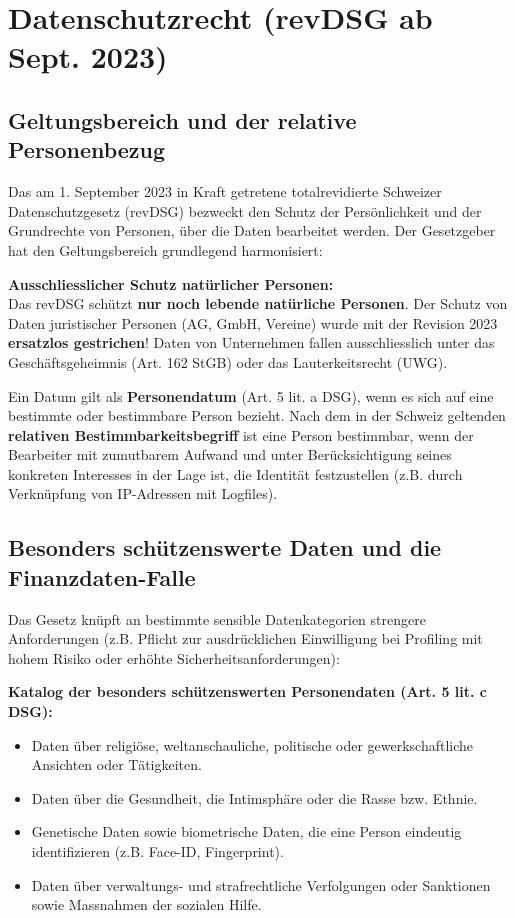 \section{Datenschutzrecht (revDSG ab Sept. 2023)}

\subsection{Geltungsbereich und der relative Personenbezug}

Das am 1. September 2023 in Kraft getretene totalrevidierte Schweizer Datenschutzgesetz (revDSG) bezweckt den Schutz der Persönlichkeit und der Grundrechte von Personen, über die Daten bearbeitet werden. Der Gesetzgeber hat den Geltungsbereich grundlegend harmonisiert:

\begin{theorem}
    \textbf{Ausschliesslicher Schutz natürlicher Personen:} \\
    Das revDSG schützt \textbf{nur noch lebende natürliche Personen}. Der Schutz von Daten juristischer Personen (AG, GmbH, Vereine) wurde mit der Revision 2023 \textbf{ersatzlos gestrichen}! Daten von Unternehmen fallen ausschliesslich unter das Geschäftsgeheimnis (Art. 162 StGB) oder das Lauterkeitsrecht (UWG).
\end{theorem}

Ein Datum gilt als \textbf{Personendatum} (Art. 5 lit. a DSG), wenn es sich auf eine bestimmte oder bestimmbare Person bezieht. Nach dem in der Schweiz geltenden \textbf{relativen Bestimmbarkeitsbegriff} ist eine Person bestimmbar, wenn der Bearbeiter mit zumutbarem Aufwand und unter Berücksichtigung seines konkreten Interesses in der Lage ist, die Identität festzustellen (z.B. durch Verknüpfung von IP-Adressen mit Logfiles).

\subsection{Besonders schützenswerte Daten und die Finanzdaten-Falle}

Das Gesetz knüpft an bestimmte sensible Datenkategorien strengere Anforderungen (z.B. Pflicht zur ausdrücklichen Einwilligung bei Profiling mit hohem Risiko oder erhöhte Sicherheitsanforderungen):

\begin{definition}
    \textbf{Katalog der besonders schützenswerten Personendaten (Art. 5 lit. c DSG):}
    \begin{itemize}
        \item Daten über religiöse, weltanschauliche, politische oder gewerkschaftliche Ansichten oder Tätigkeiten.
        \item Daten über die Gesundheit, die Intimsphäre oder die Rasse bzw. Ethnie.
        \item Genetische Daten sowie biometrische Daten, die eine Person eindeutig identifizieren (z.B. Face-ID, Fingerprint).
        \item Daten über verwaltungs- und strafrechtliche Verfolgungen oder Sanktionen sowie Massnahmen der sozialen Hilfe.
    \end{itemize}
\end{definition}

